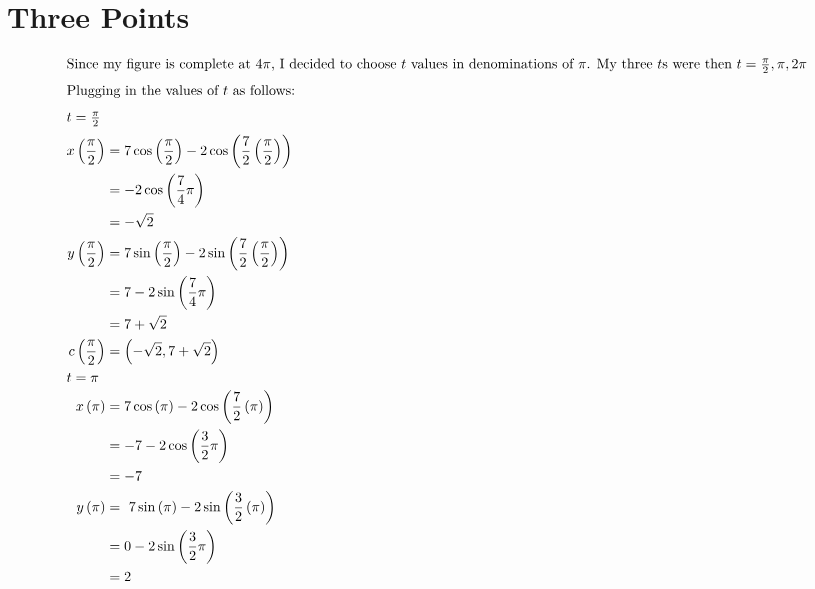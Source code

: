 \documentclass[12pt]{article}
\begin{document}
\section{Three Points}
\begin{align}
  \intertext{Since my figure is complete at $4\pi$, I decided to choose $t$ values in denominations of $\pi$. My three $t$s were then $t={\frac{\pi}{2},\pi, 2\pi}$}
  \intertext{Plugging in the values of $t$ as follows:}
  \intertext{$t=\frac{\pi}{2}$}
  x\left(\frac{\pi}{2}\right) & =7\cos\left(\frac{\pi}{2}\right)-2\cos\left(\frac{7}{2}\left(\frac{\pi}{2}\right)\right) \\
                              & =-2\cos\left(\frac{7}{4}\pi\right)                                                       \\
                              & =-\sqrt{2}                                                                               \\
  y\left(\frac{\pi}{2}\right) & =7\sin\left(\frac{\pi}{2}\right)-2\sin\left(\frac{7}{2}\left(\frac{\pi}{2}\right)\right) \\
                              & =7-2\sin\left(\frac{7}{4}\pi\right)                                                      \\
                              & =7+\sqrt{2}                                                                              \\
  c\left(\frac{\pi}{2}\right) & =\left(-\sqrt{2},7+\sqrt{2}\right)                                                       \\
  \intertext{$t=\pi$}
  x\left(\pi\right)           & =7\cos\left(\pi\right)-2\cos\left(\frac{7}{2}\left(\pi\right)\right)                     \\
                              & =-7-2\cos\left(\frac{3}{2}\pi\right)                                                     \\
                              & =-7                                                                                      \\
  y\left(\pi\right)           & =\ 7\sin\left(\pi\right)-2\sin\left(\frac{3}{2}\left(\pi\right)\right)                   \\
                              & =0-2\sin\left(\frac{3}{2}\pi\right)                                                      \\
                              & =2                                                                                       \\

\end{align}
\end{document}
